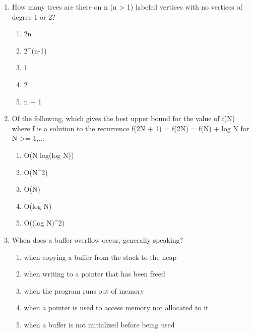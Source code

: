 \documentclass[12pt]{article}
\begin{document}
\begin{enumerate}[label=\arabic*.]
\begin{enumerate}[label=(\alph*)]
    \item 60
    \item 63
    \item 84
    \item 45
\end{enumerate}
\item How many trees are there on n (n \textgreater{} 1) labeled vertices with no vertices of degree 1 or 2?
\begin{enumerate}[label=(\alph*)]
    \item 2n
    \item 2\^{}(n-1)
    \item 1
    \item 2
    \item n + 1
\end{enumerate}
\item Of the following, which gives the best upper bound for the value of f(N) where f is a solution to the recurrence f(2N + 1) = f(2N) = f(N) + log N for N \textgreater{}= 1,...
\begin{enumerate}[label=(\alph*)]
    \item O(N log(log N))
    \item O(N\^{}2)
    \item O(N)
    \item O(log N)
    \item O((log N)\^{}2)
\end{enumerate}
\item When does a buffer overflow occur, generally speaking?
\begin{enumerate}[label=(\alph*)]
    \item when copying a buffer from the stack to the heap
    \item when writing to a pointer that has been freed
    \item when the program runs out of memory
    \item when a pointer is used to access memory not allocated to it
    \item when a buffer is not initialized before being used
\end{enumerate}
\end{enumerate}
\end{document}
